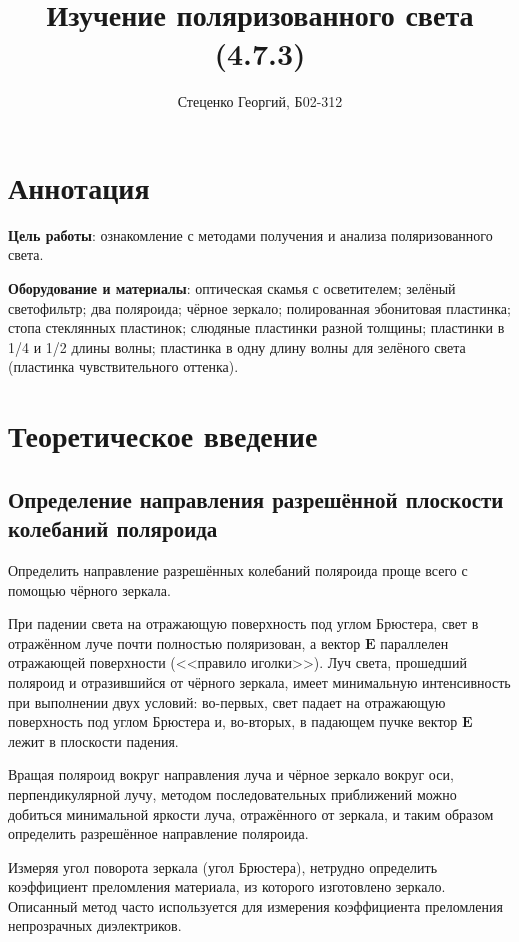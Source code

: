 \documentclass[12pt, a4paper]{article}
\title{Изучение поляризованного света (4.7.3)}
\author{Стеценко Георгий, Б02-312}
\date{}
\begin{document}
\maketitle

\section{Аннотация}
\sloppy \textbf{Цель работы}: ознакомление с методами получения и анализа
поляризованного света.

\textbf{Оборудование и материалы}: оптическая скамья с осветителем; зелёный
светофильтр; два поляроида; чёрное зеркало; полированная эбонитовая пластинка;
стопа стеклянных пластинок; слюдяные пластинки разной толщины; пластинки в 1/4
и 1/2 длины волны; пластинка в одну длину волны для зелёного света (пластинка
чувствительного оттенка).

\section{Теоретическое введение}

\subsection{Определение направления разрешённой плоскости колебаний поляроида}

Определить направление разрешённых колебаний поляроида проще всего с помощью
чёрного зеркала.

При падении света на отражающую поверхность под углом Брюстера, свет в
отражённом луче почти полностью поляризован, а вектор $\mathbf{E}$ параллелен
отражающей поверхности (<<правило иголки>>). Луч света, прошедший поляроид и
отразившийся от чёрного зеркала, имеет минимальную интенсивность при выполнении
двух условий: во-первых, свет падает на отражающую поверхность под углом
Брюстера и, во-вторых, в падающем пучке вектор $\mathbf{E}$ лежит в плоскости
падения.

Вращая поляроид вокруг направления луча и чёрное зеркало вокруг оси,
перпендикулярной лучу, методом последовательных приближений можно добиться
минимальной яркости луча, отражённого от зеркала, и таким образом определить
разрешённое направление поляроида.

Измеряя угол поворота зеркала (угол Брюстера), нетрудно определить коэффициент
преломления материала, из которого изготовлено зеркало. Описанный метод часто
используется для измерения коэффициента преломления непрозрачных диэлектриков.
\end{document}

